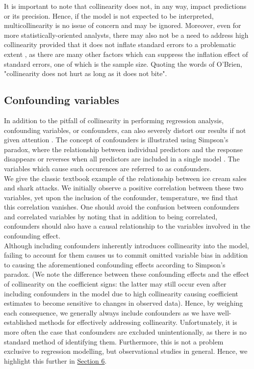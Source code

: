 \documentclass[12pt]{article}
\begin{document}
	It is important to note that collinearity does not, in any way, impact predictions or its precision. Hence, if the model is not expected to be interpreted, multicollinearity is no issue of concern and may be ignored. Moreover, even for more statistically-oriented analysts, there may also not be a need to address high collinearity provided that it does not inflate standard errors to a problematic extent \cite{OBrien2007}, as there are many other factors which can suppress the inflation effect of standard errors, one of which is the sample size. Quoting the words of O'Brien, "collinearity does not hurt as long as it does not bite".\cite{OBrien2007}
	
	
	
	
	\subsection{Confounding variables}
	
	In addition to the pitfall of collinearity in performing regression analysis, confounding variables, or confounders, can also severely distort our results if not given attention \cite{Johnston2018}. The concept of confounders is illustrated using Simpson's paradox, where the relationship between individual predictors and the response disappears or reverses when all predictors are included in a single model \cite{Agresti2015}. The variables which cause such occurences are referred to as confounders.\\
	
	We give the classic textbook example of the relationship between ice cream sales and shark attacks. We initially observe a positive correlation between these two variables, yet upon the inclusion of the confounder, temperature, we find that this correlation vanishes. One should avoid the confusion between confounders and correlated variables by noting that in addition to being correlated, confounders should also have a causal relationship to the variables involved in the confounding effect.\\
	
	Although including confounders inherently introduces collinearity into the model, failing to account for them causes us to commit omitted variable bias in addition to causing the aforementioned confounding effects according to Simpson's paradox. (We note the difference between these confounding effects and the effect of collinearity on the coefficient signs: the latter may still occur even after including confounders in the model due to high collinearity causing coefficient estimates to become sensitive to changes in observed data). Hence, by weighing each consequence, we generally always include confounders as we have well-established methods for effectively addressing collinearity. Unfortunately, it is more often the case that confounders are excluded unintentionally, as there is no standard method of identifying them. Furthermore, this is not a problem exclusive to regression modelling, but observational studies in general. Hence, we highlight this further in \hyperref[sec:future-rec]{Section 6}.
	
\end{document}
